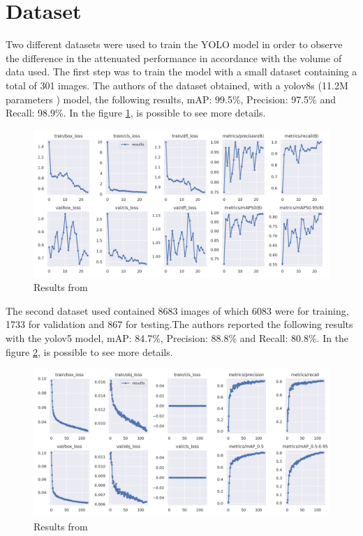 \documentclass[12pt]{article}
\begin{document}

\section{Dataset}
Two different datasets were used to train the YOLO model in order to observe the difference in the attenuated performance in accordance with the volume of data used. The first step was to train the model with a small dataset \cite{carplate-xuk6s_dataset} containing a total of 301 images. The authors of the dataset obtained, with a yolov8s (11.2M parameters \cite{yolo1}) model, the following results, mAP: 99.5\%, Precision: 97.5\% and Recall: 98.9\%. In the figure \ref{fig:mesh1}, is possible to see more details.

\begin{figure}[H]
    \centering
    \includegraphics[width=1\linewidth]{results_small dataset.png}
    \caption{Results from \cite{carplate-xuk6s_dataset}}
    \label{fig:mesh1}
\end{figure}

The second dataset \cite{tablice-73he1_dataset} used contained 8683 images of which 6083 were for training, 1733 for validation and 867 for testing.The authors reported the following results with the yolov5 model, mAP: 84.7\%, Precision: 88.8\% and Recall: 80.8\%. In the figure \ref{fig:mesh2}, is possible to see more details.

\begin{figure}[H]
    \centering
    \includegraphics[width=1\linewidth]{results_big_dataset.png}
    \caption{Results from \cite{tablice-73he1_dataset}}
    \label{fig:mesh2}
\end{figure}
\end{document}
